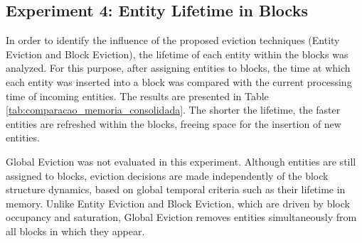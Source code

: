 \documentclass{ieeeaccess}
\begin{document}
\begin{table}[!t]
\centering
\caption{Results for Global Eviction on evaluated datasets.}
\label{tab:resultados_consolidados_global_rotacionada}

\scriptsize
\setlength{\tabcolsep}{3pt}
\renewcommand{\arraystretch}{0.95}
\end{table}


\subsection{Experiment 4: Entity Lifetime in Blocks}

In order to identify the influence of the proposed eviction techniques (Entity Eviction and Block Eviction), the lifetime of each entity within the blocks was analyzed. For this purpose, after assigning entities to blocks, the time at which each entity was inserted into a block was compared with the current processing time of incoming entities. The results are presented in Table \ref{tab:comparacao_memoria_consolidada}. The shorter the lifetime, the faster entities are refreshed within the blocks, freeing space for the insertion of new entities.

Global Eviction was not evaluated in this experiment. Although entities are still assigned to blocks, eviction decisions are made independently of the block structure dynamics, based on global temporal criteria such as their lifetime in memory. Unlike Entity Eviction and Block Eviction, which are driven by block occupancy and saturation, Global Eviction removes entities simultaneously from all blocks in which they appear.
\end{document}
